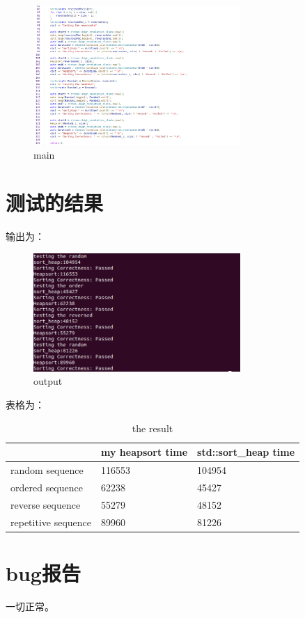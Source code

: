 \documentclass[UTF8]{ctexart}
\begin{document}
	\begin{figure}[H] %
		\centering %
		\includegraphics[width=0.7\textwidth]{fig5} %
		\caption{main} %
	\end{figure}

	
	\section{测试的结果}
	
	
	输出为： 
	
	\begin{figure}[H] %
		\centering %
		\includegraphics[width=0.7\textwidth]{fig6} %
		\caption{output} %
	\end{figure}





	表格为：
	
	\begin{table}[H]
		\centering
		\begin{tabular}{|l|l|l|}
			\hline
			~ & my heapsort time & std::sort\_heap time \\ \hline
			random sequence & 116553 & 104954 \\ \hline
			ordered sequence & 62238 & 45427 \\ \hline
			reverse sequence & 55279 & 48152 \\ \hline
			repetitive sequence & 89960 & 81226 \\ \hline
		\end{tabular}
		\caption{the result}
	\end{table}
	
	\section{bug报告}
	
	一切正常。
	
\end{document}
